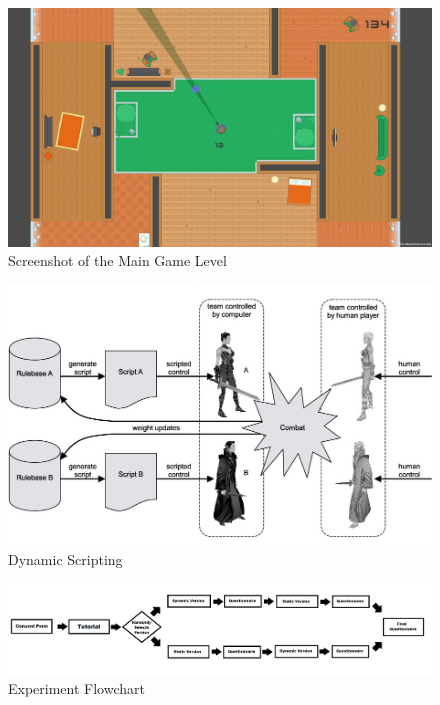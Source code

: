 \documentclass[journal]{IEEEtran}
\begin{document}
\begin{figure}[h]
	\includegraphics[width=0.75\linewidth]{maingame.jpg}
	\caption{Screenshot of the Main Game Level}
	\label{fig::20}
\end{figure} 

\begin{figure}[h]
	\includegraphics[width=1.0\linewidth]{dynamicscripting.jpg}
	\caption{Dynamic Scripting}
	\label{fig::21}
\end{figure} 

\begin{figure}[h]
	\includegraphics[width=1.0\linewidth]{ArtefactFlowchart.jpg}
	\caption{Experiment Flowchart}
	\label{fig::22}
\end{figure} 
\end{document}
